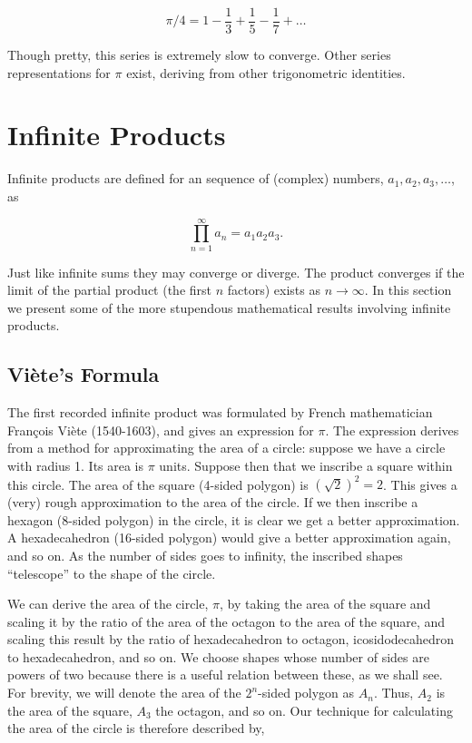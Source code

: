 \documentclass[11pt]{amsart}
\begin{document}
$$\pi/4 = 1 - \frac{1}{3} + \frac{1}{5} - \frac{1}{7} + \dots$$

Though pretty, this series is extremely slow to converge. Other series representations for $\pi$ exist, deriving from other trigonometric identities.

\section{Infinite Products}

Infinite products are defined for an sequence of (complex) numbers, $a_1, a_2, a_3, \dots$, as

$$\prod_{n=1}^{\infty}a_n = a_1a_2a_3.$$

Just like infinite sums they may converge or diverge. The product converges if the limit of the partial product (the first $n$ factors) exists as $n \to \infty$. In this section we present some of the more stupendous mathematical results involving infinite products.

\subsection{Vi\`ete's Formula}

The first recorded infinite product was formulated by French mathematician Fran\c cois Vi\`ete (1540-1603), and gives an expression for $\pi$. The expression derives from a method for approximating the area of a circle: suppose we have a circle with radius 1. Its area is $\pi$ units. Suppose then that we inscribe a square within this circle. The area of the square (4-sided polygon) is $(\sqrt{2})^2 = 2$. This gives a (very) rough approximation to the area of the circle. If we then inscribe a hexagon (8-sided polygon) in the circle, it is clear we get a better approximation. A hexadecahedron (16-sided polygon) would give a better approximation again, and so on. As the number of sides goes to infinity, the inscribed shapes ``telescope'' to the shape of the circle.

We can derive the area of the circle, $\pi$, by taking the area of the square and scaling it by the ratio of the area of the octagon to the area of the square, and scaling this result by the ratio of hexadecahedron to octagon, icosidodecahedron to hexadecahedron, and so on. We choose shapes whose number of sides are powers of two because there is a useful relation between these, as we shall see. For brevity, we will denote the area of the $2^n$-sided polygon as $A_n$. Thus, $A_2$ is the area of the square, $A_3$ the octagon, and so on. Our technique for calculating the area of the circle is therefore described by,
\end{document}
